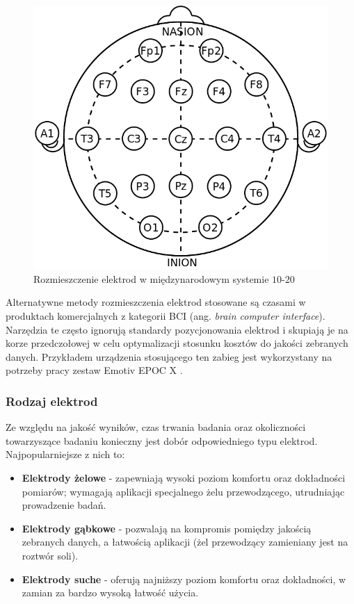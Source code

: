 \documentclass{./assets/wfis}
\begin{document}
\begin{figure}[h]
    \centering
    \includegraphics[width=0.5\columnwidth]{thesis/assets/10-20_system_electrodes.png}
    \caption[Rozmieszczenie elektrod w międzynarodowym systemie $10$-$20$]{Rozmieszczenie elektrod w międzynarodowym systemie $10$-$20$\footnotemark}
    \label{fig:10-20-system}
\end{figure}

Alternatywne metody rozmieszczenia elektrod stosowane są czasami w produktach komercjalnych z kategorii BCI (ang. \textit{brain computer interface}). Narzędzia te często ignorują standardy pozycjonowania elektrod i skupiają je na korze przedczołowej w celu optymalizacji stosunku kosztów do jakości zebranych danych. Przykładem urządzenia stosującego ten zabieg jest wykorzystany na potrzeby pracy zestaw Emotiv EPOC X \cite{emotiv_inc_epoc_nodate}. 


\subsubsection{Rodzaj elektrod}
Ze względu na jakość wyników, czas trwania badania oraz okoliczności towarzyszące badaniu konieczny jest dobór odpowiedniego typu elektrod. Najpopularniejsze z nich to:

\begin{itemize}
    \item \textbf{Elektrody żelowe} - zapewniają wysoki poziom komfortu oraz dokładności pomiarów; wymagają aplikacji specjalnego żelu przewodzącego, utrudniając prowadzenie badań.
    \item \textbf{Elektrody gąbkowe} - pozwalają na kompromis pomiędzy jakością zebranych danych, a łatwością aplikacji (żel przewodzący zamieniany jest na roztwór soli).
    \item \textbf{Elektrody suche} - oferują najniższy poziom komfortu oraz dokładności, w zamian za bardzo wysoką łatwość użycia.
\end{itemize}
\end{document}
